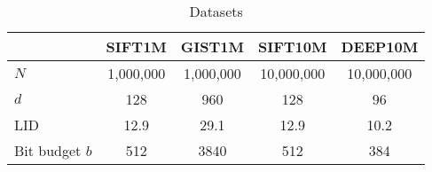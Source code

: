 \begin{table}[h]
\centering
\caption{Datasets}
\begin{tabular}{|l|c|c|c|c|}
    \hline
     & \textbf{SIFT1M} & \textbf{GIST1M} & \textbf{SIFT10M} & \textbf{DEEP10M} \\ \hline
     $N$ & 1,000,000 & 1,000,000 & 10,000,000 & 10,000,000 \\ \hline
     $d$ & 128 & 960 & 128 & 96 \\ \hline
     LID\cite{fu2021high-LID-Higher} & 12.9 & 29.1 & 12.9 & 10.2 \\ \hline
     Bit budget $b$ & 512 & 3840 & 512 & 384  \\ \hline
\end{tabular}
\label{tab:datasets}
\end{table}
